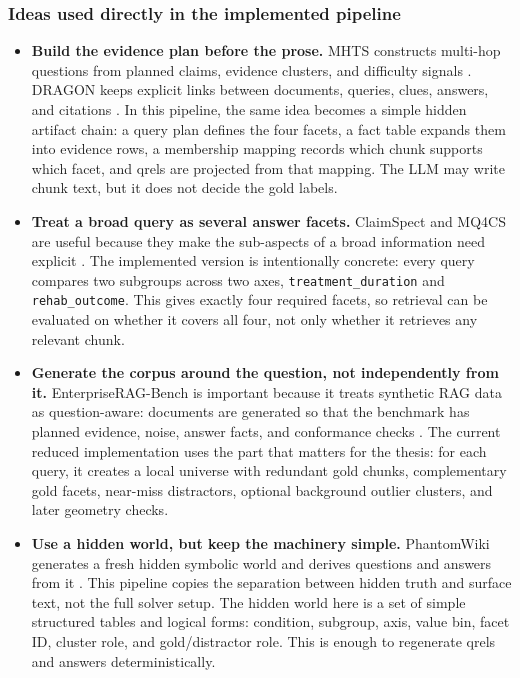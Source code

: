 \documentclass[11pt,a4paper]{article}
\newcommand{\field}[1]{\texttt{#1}}
\begin{document}
\subsubsection{Ideas used directly in the implemented pipeline}

\begin{itemize}[noitemsep, topsep=0pt]
	\item \textbf{Build the evidence plan before the prose.} MHTS constructs multi-hop questions from planned claims, evidence clusters, and difficulty signals \citep{lee2025mhts}. DRAGON keeps explicit links between documents, queries, clues, answers, and citations \citep{shen2026dragon}. In this pipeline, the same idea becomes a simple hidden artifact chain: a query plan defines the four facets, a fact table expands them into evidence rows, a membership mapping records which chunk supports which facet, and qrels are projected from that mapping. The LLM may write chunk text, but it does not decide the gold labels.
	\item \textbf{Treat a broad query as several answer facets.} ClaimSpect and MQ4CS are useful because they make the sub-aspects of a broad information need explicit \citep{kargupta2025claimspect,abbasiantaeb2026multiaspect}. The implemented version is intentionally concrete: every query compares two subgroups across two axes, \field{treatment\_duration} and \field{rehab\_outcome}. This gives exactly four required facets, so retrieval can be evaluated on whether it covers all four, not only whether it retrieves any relevant chunk.
	\item \textbf{Generate the corpus around the question, not independently from it.} EnterpriseRAG-Bench is important because it treats synthetic RAG data as question-aware: documents are generated so that the benchmark has planned evidence, noise, answer facts, and conformance checks \citep{sun2026enterpriseragbench}. The current reduced implementation uses the part that matters for the thesis: for each query, it creates a local universe with redundant gold chunks, complementary gold facets, near-miss distractors, optional background outlier clusters, and later geometry checks.
	\item \textbf{Use a hidden world, but keep the machinery simple.} PhantomWiki generates a fresh hidden symbolic world and derives questions and answers from it \citep{gong2025phantomwiki}. This pipeline copies the separation between hidden truth and surface text, not the full solver setup. The hidden world here is a set of simple structured tables and logical forms: condition, subgroup, axis, value bin, facet ID, cluster role, and gold/distractor role. This is enough to regenerate qrels and answers deterministically.

\end{itemize}
\end{document}
